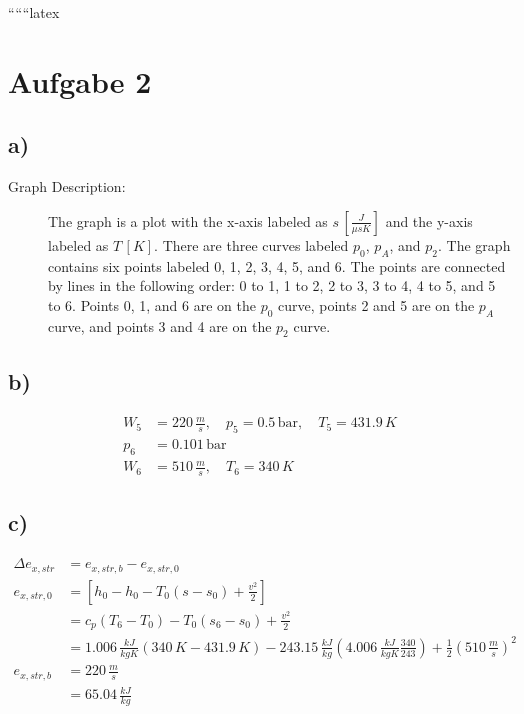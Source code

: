 
``````latex


\section*{Aufgabe 2}

\subsection*{a)}
\begin{description}
    \item[Graph Description:] The graph is a plot with the x-axis labeled as $s \, [\frac{J}{\mu s K}]$ and the y-axis labeled as $T \, [K]$. There are three curves labeled $p_0$, $p_A$, and $p_2$. The graph contains six points labeled 0, 1, 2, 3, 4, 5, and 6. The points are connected by lines in the following order: 0 to 1, 1 to 2, 2 to 3, 3 to 4, 4 to 5, and 5 to 6. Points 0, 1, and 6 are on the $p_0$ curve, points 2 and 5 are on the $p_A$ curve, and points 3 and 4 are on the $p_2$ curve.
\end{description}

\subsection*{b)}
\begin{align*}
    W_5 &= 220 \, \frac{m}{s}, \quad p_5 = 0.5 \, \text{bar}, \quad T_5 = 431.9 \, K \\
    p_6 &= 0.101 \, \text{bar} \\
    W_6 &= 510 \, \frac{m}{s}, \quad T_6 = 340 \, K
\end{align*}

\subsection*{c)}
\begin{align*}
    \Delta e_{x,str} &= e_{x,str,b} - e_{x,str,0} \\
    e_{x,str,0} &= \left[ h_0 - h_0 - T_0 (s - s_0) + \frac{v^2}{2} \right] \\
    &= c_p \left( T_6 - T_0 \right) - T_0 (s_6 - s_0) + \frac{v^2}{2} \\
    &= 1.006 \, \frac{kJ}{kg K} (340 \, K - 431.9 \, K) - 243.15 \, \frac{kJ}{kg} \left( 4.006 \, \frac{kJ}{kg K} \frac{340}{243} \right) + \frac{1}{2} \left( 510 \, \frac{m}{s} \right)^2 \\
    e_{x,str,b} &= 220 \, \frac{m}{s} \\
    &= 65.04 \, \frac{kJ}{kg}
\end{align*}

